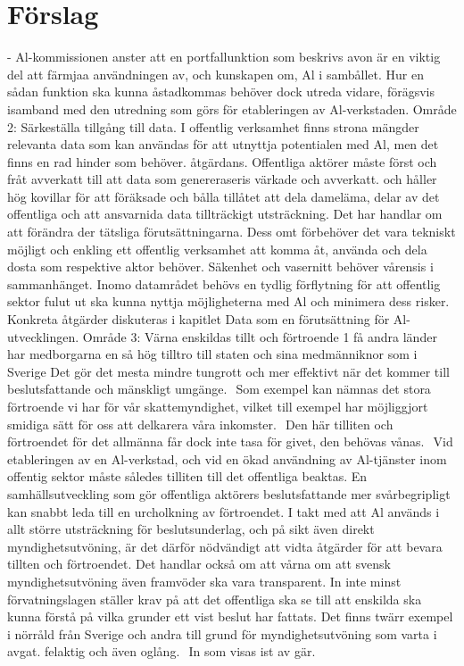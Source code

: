 {{{{{{{{{{{{{{{{\section*{Förslag}
- Al-kommissionen anster att en portfallunktion som beskrivs avon är en viktig del att färmjaa användningen av, och kunskapen om, Al i sambållet. Hur en sådan funktion ska kunna åstadkommas behöver dock utreda vidare, förägsvis isamband med den utredning som görs för etableringen av Al-verkstaden.
Område 2: Särkeställa tillgång till data.
I offentlig verksamhet finns strona mängder relevanta data som kan användas för att utnyttja potentialen med Al, men det finns en rad hinder som behöver.
åtgärdans. Offentliga aktörer måste först och fråt avverkatt till att data som genereraseris värkade och avverkatt.
och håller hög kovillar för att föräksade och bålla tillåtet att dela dameläma, delar av det offentliga och att ansvarnida data tillträckigt utsträckning. Det har handlar om att förändra der tätsliga förutsättningarna. Dess omt förbehöver det vara tekniskt möjligt och enkling ett offentlig verksamhet att komma åt, använda och dela dosta som respektive aktor behöver. Säkenhet och vasernitt behöver vårensis i sammanhänget.
Inomo datamrådet behövs en tydlig förflytning för att offentlig sektor fulut ut ska kunna nyttja möjligheterna med Al och minimera dess risker. Konkreta åtgärder diskuteras i kapitlet Data som en förutsättning för Al-utvecklingen.
Område 3: Värna enskildas tillt och förtroende 1 få andra länder har medborgarna en så hög tilltro till staten och sina medmänniknor som i Sverige
Det gör det mesta mindre tungrott och mer effektivt när det kommer till beslutsfattande och mänskligt umgänge. \({ }^{}\) Som exempel kan nämnas det stora förtroende vi har för vår skattemyndighet, vilket till exempel har möjliggjort smidiga sätt för oss att delkarera våra inkomster. \({ }^{}\) Den här tilliten och förtroendet för det allmänna får dock inte tasa för givet, den behövas vånas. \({ }^{}\) Vid etableringen av en Al-verkstad, och vid en ökad användning av Al-tjänster inom offentig sektor måste således tilliten till det offentliga beaktas.
En samhällsutveckling som gör offentliga aktörers beslutsfattande mer svårbegripligt kan snabbt leda till en urcholkning av förtroendet. I takt med att Al används i allt större utsträckning för beslutsunderlag, och på sikt även direkt myndighetsutvöning, är det därför nödvändigt att vidta åtgärder för att bevara tillten och förtroendet. Det handlar också om att vårna om att svensk myndighetsutvöning även framvöder ska vara transparent. In inte minst förvatningslagen ställer krav på att det offentliga ska se till att enskilda ska kunna förstå på vilka grunder ett vist beslut har fattats. Det finns twärr exempel i nörråld från Sverige och andra till grund för myndighetsutvöning som varta i avgat. felaktig och även oglång. \({ }^{}\) In som visas ist av gär.
}}}}}}}}}}}}}}}}
